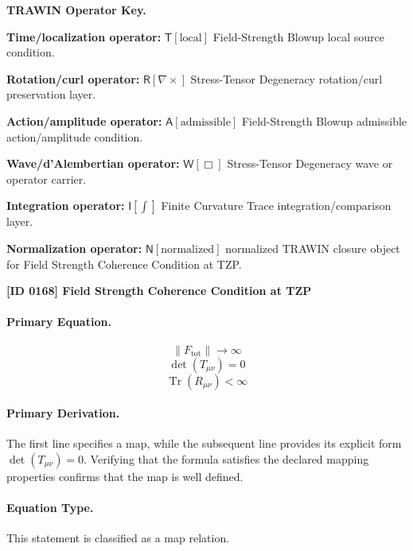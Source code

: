 \par\vspace{0.45\baselineskip}
\noindent\begin{minipage}[t]{\linewidth}
\begingroup
\small
\raggedright
\textbf{TRAWIN Operator Key.}\par
\noindent\textbf{Time/localization operator:} $\mathsf{T}\!\left[\mathrm{local}\right]$ Field-Strength Blowup local source condition.\par
\noindent\textbf{Rotation/curl operator:} $\mathsf{R}\!\left[\nabla\times\right]$ Stress-Tensor Degeneracy rotation/curl preservation layer.\par
\noindent\textbf{Action/amplitude operator:} $\mathsf{A}\!\left[\mathrm{admissible}\right]$ Field-Strength Blowup admissible action/amplitude condition.\par
\noindent\textbf{Wave/d'Alembertian operator:} $\mathsf{W}\!\left[\Box\right]$ Stress-Tensor Degeneracy wave or operator carrier.\par
\noindent\textbf{Integration operator:} $\mathsf{I}\!\left[\int\right]$ Finite Curvature Trace integration/comparison layer.\par
\noindent\textbf{Normalization operator:} $\mathsf{N}\!\left[\mathrm{normalized}\right]$ normalized TRAWIN closure object for Field Strength Coherence Condition at TZP.\par
\endgroup
\end{minipage}

\clearpage
\noindent\textbf{[ID 0168] Field Strength Coherence Condition at TZP}\par
\vspace{0.35em}
\paragraph{Primary Equation.}
\[
\|F_{\mathrm{tot}}\|\to \infty
\]
\[
\det(T_{\mu\nu})=0
\]
\[
\operatorname{Tr}(R_{\mu\nu})<\infty
\]

\paragraph{Primary Derivation.}
The first line specifies a map, while the subsequent line provides its explicit form \( \det(T_{\mu\nu})=0 \). Verifying that the formula satisfies the declared mapping properties confirms that the map is well defined.
\paragraph{Equation Type.}
This statement is classified as a map relation.

